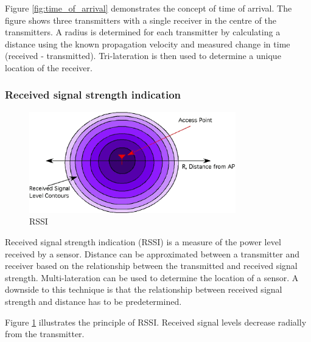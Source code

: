 \documentclass[11pt,a4paper]{report}
\begin{document}
			Figure \ref{fig:time_of_arrival} demonstrates the concept of time of arrival. The figure shows three transmitters with a single receiver in the centre of the transmitters. A radius is determined for each transmitter by calculating a distance using the known propagation velocity and measured change in time (received - transmitted). Tri-lateration is then used to determine a unique location of the receiver.
		
		\subsubsection{Received signal strength indication}
			\begin{figure}[h!]
				\centering
				\includegraphics[width=0.8\textwidth]{rssi}
				\caption{RSSI}
				\label{fig:rssi}
			\end{figure}
			Received signal strength indication (RSSI) is a measure of the power level received by a sensor. Distance can be approximated between a transmitter and receiver based on the relationship between the transmitted and received signal strength. Multi-lateration can be used to determine the location of a sensor.
			A downside to this technique is that the relationship between received signal strength and distance has to be predetermined.
			
			Figure \ref{fig:rssi} illustrates the principle of RSSI. Received signal levels decrease radially from the transmitter.
		
\end{document}
